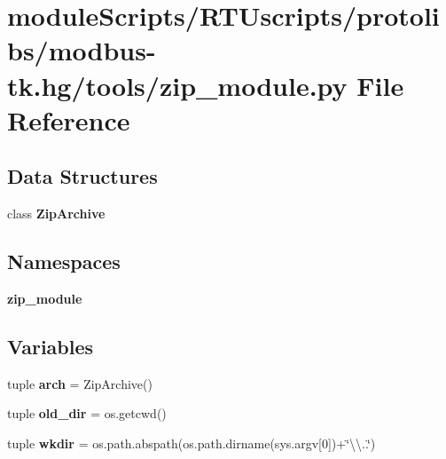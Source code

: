 \section{module\+Scripts/\+R\+T\+Uscripts/protolibs/modbus-\/tk.hg/tools/zip\+\_\+module.py File Reference}
\label{zip__module_8py}
\subsection*{Data Structures}
\begin{DoxyCompactItemize}
\item 
class {\bf Zip\+Archive}
\end{DoxyCompactItemize}
\subsection*{Namespaces}
\begin{DoxyCompactItemize}
\item 
 {\bf zip\+\_\+module}
\end{DoxyCompactItemize}
\subsection*{Variables}
\begin{DoxyCompactItemize}
\item 
tuple {\bf arch} = Zip\+Archive()
\item 
tuple {\bf old\+\_\+dir} = os.\+getcwd()
\item 
tuple {\bf wkdir} = os.\+path.\+abspath(os.\+path.\+dirname(sys.\+argv[0])+\char`\"{}\textbackslash{}\textbackslash{}..\char`\"{})
\end{DoxyCompactItemize}
